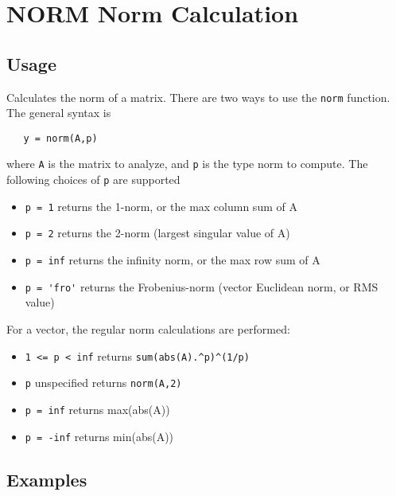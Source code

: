 \section{NORM Norm Calculation}

\subsection{Usage}

Calculates the norm of a matrix.  There are two ways to
use the \verb|norm| function.  The general syntax is
\begin{verbatim}
   y = norm(A,p)
\end{verbatim}
where \verb|A| is the matrix to analyze, and \verb|p| is the
type norm to compute.  The following choices of \verb|p|
are supported
\begin{itemize}
\item  \verb|p = 1| returns the 1-norm, or the max column sum of A

\item  \verb|p = 2| returns the 2-norm (largest singular value of A)

\item  \verb|p = inf| returns the infinity norm, or the max row sum of A

\item  \verb|p = 'fro'| returns the Frobenius-norm (vector Euclidean norm, or RMS value)

\end{itemize}
For a vector, the regular norm calculations are performed:
\begin{itemize}
\item  \verb|1 <= p < inf| returns \verb|sum(abs(A).^p)^(1/p)|

\item  \verb|p| unspecified returns \verb|norm(A,2)|

\item  \verb|p = inf| returns max(abs(A))

\item  \verb|p = -inf| returns min(abs(A))

\end{itemize}
\subsection{Examples}

